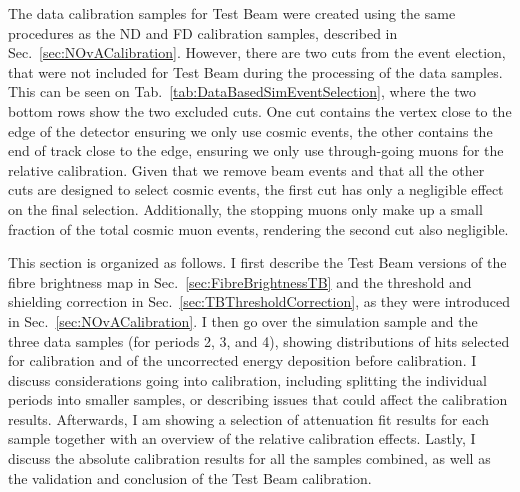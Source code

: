 The data calibration samples for Test Beam were created using the same procedures as the \gls{ND} and \gls{FD} calibration samples, described in Sec.~\ref{sec:NOvACalibration}. However, there are two cuts from the event election, that were not included for Test Beam during the processing of the data samples. This can be seen on Tab.~\ref{tab:DataBasedSimEventSelection}, where the two bottom rows show the two excluded cuts. One cut contains the vertex close to the edge of the detector ensuring we only use cosmic events, the other contains the end of track close to the edge, ensuring we only use through-going muons for the relative calibration. Given that we remove beam events and that all the other cuts are designed to select cosmic events, the first cut has only a negligible effect on the final selection. Additionally, the stopping muons only make up a small fraction of the total cosmic muon events, rendering the second cut also negligible.

This section is organized as follows. I first describe the Test Beam versions of the fibre brightness map in Sec.~\ref{sec:FibreBrightnessTB} and the threshold and shielding correction in Sec.~\ref{sec:TBThresholdCorrection}, as they were introduced in Sec.~\ref{sec:NOvACalibration}. I then go over the simulation sample and the three data samples (for periods 2, 3, and 4), showing distributions of hits selected for calibration and of the uncorrected energy deposition before calibration. I discuss considerations going into calibration, including splitting the individual periods into smaller samples, or describing issues that could affect the calibration results.  Afterwards, I am showing a selection of attenuation fit results for each sample together with an overview of the relative calibration effects. Lastly, I discuss the absolute calibration results for all the samples combined, as well as the validation and conclusion of the Test Beam calibration.



